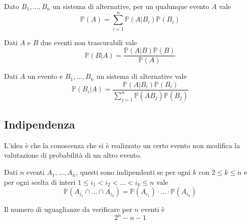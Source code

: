 \begin{theorem}
	Dato $B_1, \ldots, B_n$ un sistema di alternative, per un qualunque evento $A$ vale
	\begin{equation}
		\mathbb{P}(A) = \sum_{i=1}^{n} \mathbb{P}(A \vert B_i) \mathbb{P}(B_i)
	\end{equation}
\end{theorem}

\begin{definition}
	Dati $A$ e $B$ due eventi non trascurabili vale
	\begin{equation}
		\mathbb{P}(B \vert A) = \frac{\mathbb{P}(A \vert B)\mathbb{P}(B)}{\mathbb{P}(A)}
	\end{equation}
\end{definition}
\begin{definition}
	Dati $A$ un evento e $B_1, \ldots, B_n$ un sistema di alternative vale
	\begin{equation}
		\mathbb{P}(B_i \vert A) = \frac{\mathbb{P}(A \vert B_i)\mathbb{P}(B_i)}{\sum_{j=1}^{n} \mathbb{P}(A B_j)\mathbb{P}(B_j)}
	\end{equation}
\end{definition}

\subsection{Indipendenza}
L'idea è che la conoscenza che si è realizzato un certo evento non modifica la valutazione di probabilità di un altro evento.
\begin{definition}
	Dati $n$ eventi $A_1, \ldots, A_n$, questi sono indipendenti se per ogni $k$ con $2 \leq k \leq n$ e per ogni scelta di interi $1 \leq i_1 < i_2< \ldots < i_k \leq n$ vale
	\begin{equation}
		\mathbb{P}(A_{i_1} \cap \ldots \cap A_{i_k}) = \mathbb{P}(A_{i_1}) \cdot  \ldots \cdot \mathbb{P}(A_{i_k})
	\end{equation}
\end{definition}

\begin{observation}[Complessità]
	Il numero di uguaglianze da verificare per $n$ eventi è
	\begin{equation*}
		2^n -n -1
	\end{equation*}
\end{observation}

